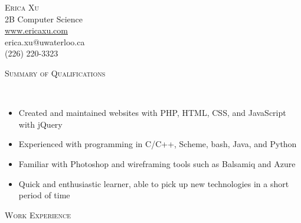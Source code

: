 \documentclass[9pt]{article}
\newenvironment{changemargin}[2]{%
  \begin{list}{}{%
    \setlength{\topsep}{0pt}%
    \setlength{\leftmargin}{#1}%
    \setlength{\rightmargin}{#2}%
    \setlength{\listparindent}{\parindent}%
    \setlength{\itemindent}{\parindent}%
    \setlength{\parsep}{\parskip}%
  }%
  \item[]}{\end{list}
}
\newcommand{\lineover}{
	\begin{changemargin}{-0.05in}{-0.05in}
		\vspace*{-8pt}
		\hrulefill \\
		\vspace*{-2pt}
	\end{changemargin}
}
\newcommand{\header}[1]{
	\begin{changemargin}{-0.5in}{-0.5in}
		\scshape{#1}\\
  	\lineover
	\end{changemargin}
}
\newcommand{\contact}[5]{
	\begin{changemargin}{-0.5in}{-0.5in}
		\begin{center}
			{\LARGE \scshape {#1}}\\ \medskip
			{\large {#2}}\\ \smallskip 
			{#3}\\ \smallskip
			{#4}\\ \smallskip
			{#5}
		\end{center}
	\end{changemargin}
}
\newenvironment{body} {
	\vspace*{-16pt}
	\begin{changemargin}{-0.25in}{-0.5in}
  }	
	{\end{changemargin}
}
\begin{document}
\contact{Erica Xu}{2B Computer Science}{\underline{\url{www.ericaxu.com}}}{erica.xu@uwaterloo.ca}{(226) 220-3323}

\header{Summary of Qualifications}

\begin{body}
	\vspace{14pt}
	\begin{itemize}
		\item Created and maintained websites with PHP, HTML, CSS, and JavaScript with jQuery
		\item Experienced with programming in C/C++, Scheme, bash, Java, and Python
		\item Familiar with Photoshop and wireframing tools such as Balsamiq and Azure
		\item Quick and enthusiastic learner, able to pick up new technologies in a short period of time
	\end{itemize}
  \medskip

\end{body}

\header{Work Experience}
\end{document}
